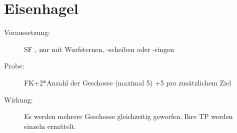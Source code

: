 \section{Eisenhagel}
\label{fkM.eisenhagel}
\begin{description}
    \item[Voraussetzung:]
        SF , nur mit Wurfsternen, -scheiben oder -ringen
    \item[Probe:]
        FK+2*Anzahl der Geschosse (maximal 5) +5 pro zusätzlichem Ziel
    \item[Wirkung:]
        Es werden mehrere Geschosse gleichzeitig geworfen. Ihre TP werden einzeln ermittelt.
\end{description}
